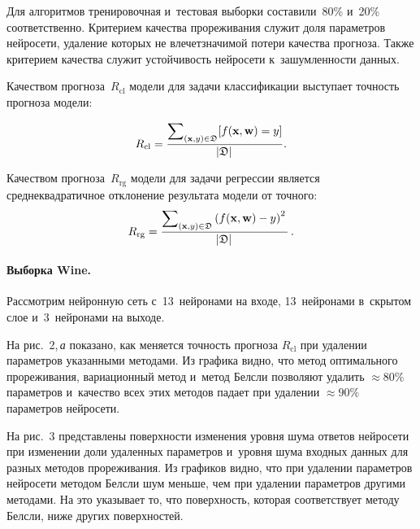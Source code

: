 \begin{multicols}{2}
Для алгоритмов тренировочная и~тестовая выборки составили~80\% и~20\% 
соответственно. Критерием качества прореживания служит доля па\-ра\-мет\-ров 
нейросети, удаление которых не влечет\linebreak значимой потери качества прогноза. Так\-же 
критерием качества служит устой\-чи\-вость нейросети к~зашумленности данных.

Качеством прогноза~$R_{\mathrm{cl}}$ модели для задачи классификации выступает 
точность прогноза модели:

\vspace*{4pt}

\noindent
\begin{equation*}
R_{\mathrm{cl}} = \displaystyle\frac{\displaystyle \sum\nolimits_{(\textbf{x},y)\in \mathfrak{D}} [f(\textbf{x}, 
\mathbf{w}) = y]\mathstrut}{\displaystyle \left|\mathfrak{D}\right|\mathstrut}. 
\end{equation*}

Качеством прогноза~$R_{\mathrm{rg}} $ модели для задачи регрессии является 
сред\-не\-квад\-ра\-тич\-ное отклонение результата модели от точ\-ного:
\begin{equation*}
R_{\mathrm{rg}} = \displaystyle\frac{\displaystyle \sum\nolimits_{(\mathbf{x},y)\in \mathfrak{D}} 
\left(f(\mathbf{x}, \mathbf{w}) - 
y\right)^2\mathstrut}{\displaystyle \left|\mathfrak{D}\right|\mathstrut}\,.
\end{equation*}

\vspace*{-5pt}

\paragraph*{Выборка Wine.} Рассмотрим нейронную сеть с~13~нейронами на входе, 
13~нейронами в~скрытом слое и~3~нейронами на выходе.


  

На рис.~2,\,\textit{а} показано, как меняется точ\-ность прогноза $R_{\mathrm{cl}}$ 
при удалении па\-ра\-мет\-ров указанными методами. Из графика видно, что метод 
оптимального прореживания, вариационный метод и~метод Белсли поз\-во\-ля\-ют удалить 
$\approx80\%$ па\-ра\-мет\-ров и~качество всех этих методов падает при удалении 
$\approx90\%$ па\-ра\-мет\-ров нейросети.

На рис.~3 представлены по\-верх\-ности изменения уровня шума ответов 
нейросети при изменении доли удаленных па\-ра\-мет\-ров и~уровня шума вход\-ных 
данных для раз\-ных методов прореживания. Из графиков видно, что при удалении 
па\-ра\-мет\-ров нейросети методом Белсли шум меньше, чем при удалении па\-ра\-мет\-ров 
другими методами. На это указывает то, что по\-верх\-ность, которая соответствует 
методу Белсли, ниже других поверхностей.




\end{multicols}
